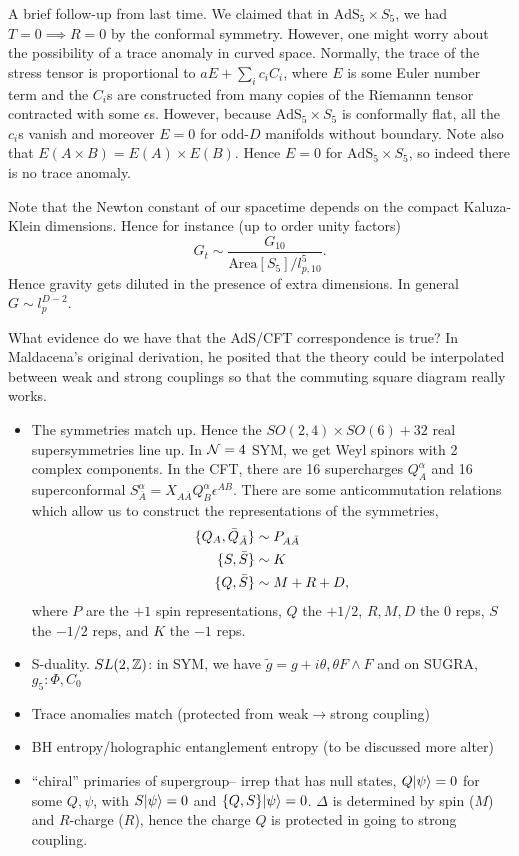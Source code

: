 A brief follow-up from last time. We claimed that in $\text{AdS}_5\times S_5$, we had $T=0\implies R=0$ by the conformal symmetry. However, one might worry about the possibility of a trace anomaly in curved space. Normally, the trace of the stress tensor is proportional to $aE+\sum_i c_i C_i$, where $E$ is some Euler number term and the $C_i$s are constructed from many copies of the Riemannn tensor contracted with some $\epsilon$s. However, because $\text{AdS}_5\times S_5$ is conformally flat, all the $c_i$s vanish and moreover $E=0$ for odd-$D$ manifolds without boundary. Note also that $E(A\times B)=E(A)\times E(B)$. Hence $E=0$ for $\text{AdS}_5\times S_5$, so indeed there is no trace anomaly.

Note that the Newton constant of our spacetime depends on the compact Kaluza-Klein dimensions. Hence for instance (up to order unity factors)
\begin{equation}
    G_t \sim \frac{G_{10}}{\text{Area}[S_5]/l_{p,10}^5}.
\end{equation}
Hence gravity gets diluted in the presence of extra dimensions. In general $G\sim l_p^{D-2}$.

What evidence do we have that the AdS/CFT correspondence is true? In Maldacena's original derivation, he posited that the theory could be interpolated between weak and strong couplings so that the commuting square diagram really works.
\begin{itemize}
    \item The symmetries match up. Hence the $SO(2,4)\times SO(6)+32$ real supersymmetries line up. In $\mathcal N=4$ SYM, we get Weyl spinors with 2 complex components. In the CFT, there are 16 supercharges $Q_A^\alpha$ and 16 superconformal $S_{\bar A}^\alpha = X_{A\bar A} Q_B^\alpha \epsilon^{AB}$.%
    There are some anticommutation relations which allow us to construct the representations of the symmetries,
    \begin{align*}
        \{Q_A,\bar Q_{\bar A}\} &\sim P_{A\bar A}\\
        \{S,\bar S\} &\sim K\\
        \{Q,\bar S\} &\sim M+R+D,
    \end{align*}
    where $P$ are the $+1$ spin representations, $Q$ the $+1/2$, $R,M,D$ the $0$ reps, $S$ the $-1/2$ reps, and $K$ the $-1$ reps.
    \item S-duality. $SL(2,\mathbb{Z})$: in SYM, we have $\tilde g=g + i\theta, \theta F \wedge F$ and on SUGRA, $g_5:\Phi,C_0$
    \item Trace anomalies match (protected from weak$\to$strong coupling)
    \item BH entropy/holographic entanglement entropy (to be discussed more alter)
    \item ``chiral'' primaries of supergroup-- irrep that has null states, $Q\lvert\psi\rangle=0$ for some $Q,\psi$, with $S\lvert\psi\rangle=0$ and $\{Q,S\}\lvert\psi\rangle=0$. $\Delta$ is determined by spin ($M$) and $R$-charge ($R$), hence the charge $Q$ is protected in going to strong coupling.
\end{itemize}

